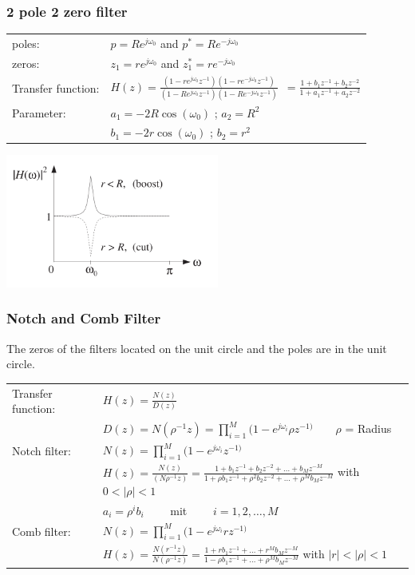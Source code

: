 \subsubsection{2 pole 2 zero filter}

\begin{tabular}[b]{l l}
	poles: & $ p = R e^{j\omega_0}$ \qquad and \qquad $ p^* = R e^{-j\omega_0}$
	\\ 
	zeros: & $ z_1 = r e^{j\omega_0}$ \qquad and \qquad $ z_1^* = r e^{-j\omega_0}$
	\\
	Transfer function: & $H(z)= \frac{(1-r e^{j\omega_0}z^{-1})(1-re^{-j\omega_0}z^{-1})}{(1-R e^{j\omega_0}z^{-1})(1-Re^{-j\omega_0}z^{-1})}$\
	$=\frac{1+b_1z^{-1}+b_2z^{-2}}{1+a_1z^{-1}+a_2z^{-2}}$
	\\ 
	Parameter: & $a_1 = -2R\cos(\omega_0)$ \qquad; \qquad $a_2 = R^2$
	\\ 
	& $b_1 = -2r\cos(\omega_0)$ \qquad; \qquad $b_2 = r^2$
\end{tabular}
\includegraphics[width=7cm]{./picture/pole_zero_filter}

\subsubsection{Notch and Comb Filter}
The zeros of the filters located on the unit circle and the poles are in the unit
circle.

\begin{tabular}{l l}
	Transfer function: & $H(z) = \frac{N(z)}{D(z)} $
	\\
  & $D(z) = N(\rho^{-1}z)  = \prod\limits_{i=1}^{M}(1- e^{j\omega_i}\rho z^{-1)} \qquad \rho$ = Radius	\\
  
  Notch filter:	
	& $N(z) = \prod\limits_{i=1}^{M}(1- e^{j\omega_i}z^{-1)} $ \\
	& $H(z) = \frac{N(z)}{(N\rho^{-1}z)}= \frac{1+b_1 z^{-1} + b_2z^{-2} + \ldots + b_M z^{-M}}
	{1+\rho b_1 z^{-1} + \rho^2 b_2z^{-2} + \ldots + \rho^M b_M z^{-M}} $ \qquad with $0 < |\rho| < 1$\\
	&$a_i=\rho^ib_i \qquad$ mit $\qquad i=1,2,\ldots,M$ \\
	
	Comb filter:
	& $N(z) = \prod\limits_{i=1}^{M}(1- e^{j\omega_i}rz^{-1)} $ \\
	& $H(z) = \frac{N(r^{-1}z)}{N(\rho^{-1}z)} 
	= \frac{1+rb_1z^{-1}+\ldots+r^Mb_Mz^{-M}}{1-\rho b_1z^{-1}+\ldots+\rho^Mb_Mz^{-M}}$ \qquad with $|r| < |\rho| < 1$ 
	\end{tabular}
	
